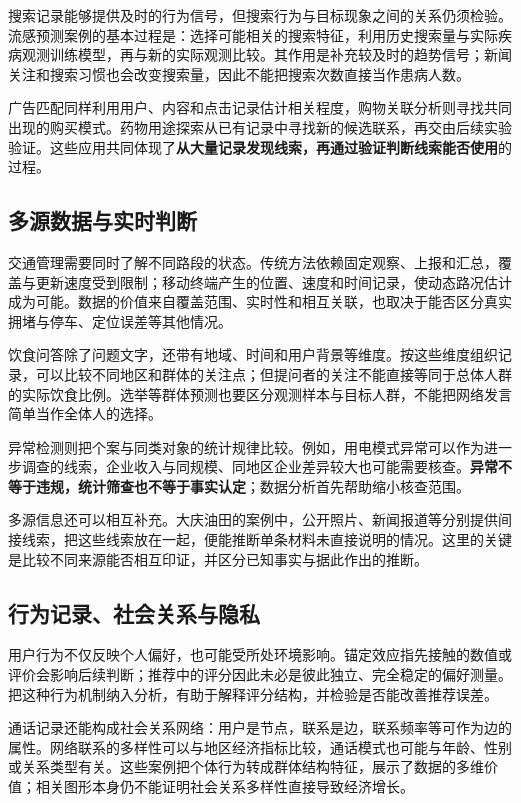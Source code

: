 \documentclass[UTF8,fontset=fandol,a4paper,12pt]{ctexart}
\theoremstyle{definition}
\begin{document}
搜索记录能够提供及时的行为信号，但搜索行为与目标现象之间的关系仍须检验。流感预测案例的基本过程是：选择可能相关的搜索特征，利用历史搜索量与实际疾病观测训练模型，再与新的实际观测比较。其作用是补充较及时的趋势信号；新闻关注和搜索习惯也会改变搜索量，因此不能把搜索次数直接当作患病人数。

广告匹配同样利用用户、内容和点击记录估计相关程度，购物关联分析则寻找共同出现的购买模式。药物用途探索从已有记录中寻找新的候选联系，再交由后续实验验证。这些应用共同体现了\textbf{从大量记录发现线索，再通过验证判断线索能否使用}的过程。

\subsection{多源数据与实时判断}
交通管理需要同时了解不同路段的状态。传统方法依赖固定观察、上报和汇总，覆盖与更新速度受到限制；移动终端产生的位置、速度和时间记录，使动态路况估计成为可能。数据的价值来自覆盖范围、实时性和相互关联，也取决于能否区分真实拥堵与停车、定位误差等其他情况。

饮食问答除了问题文字，还带有地域、时间和用户背景等维度。按这些维度组织记录，可以比较不同地区和群体的关注点；但提问者的关注不能直接等同于总体人群的实际饮食比例。选举等群体预测也要区分观测样本与目标人群，不能把网络发言简单当作全体人的选择。

异常检测则把个案与同类对象的统计规律比较。例如，用电模式异常可以作为进一步调查的线索，企业收入与同规模、同地区企业差异较大也可能需要核查。\textbf{异常不等于违规，统计筛查也不等于事实认定}；数据分析首先帮助缩小核查范围。

多源信息还可以相互补充。大庆油田的案例中，公开照片、新闻报道等分别提供间接线索，把这些线索放在一起，便能推断单条材料未直接说明的情况。这里的关键是比较不同来源能否相互印证，并区分已知事实与据此作出的推断。

\subsection{行为记录、社会关系与隐私}
用户行为不仅反映个人偏好，也可能受所处环境影响。锚定效应指先接触的数值或评价会影响后续判断；推荐中的评分因此未必是彼此独立、完全稳定的偏好测量。把这种行为机制纳入分析，有助于解释评分结构，并检验是否能改善推荐误差。

通话记录还能构成社会关系网络：用户是节点，联系是边，联系频率等可作为边的属性。网络联系的多样性可以与地区经济指标比较，通话模式也可能与年龄、性别或关系类型有关。这些案例把个体行为转成群体结构特征，展示了数据的多维价值；相关图形本身仍不能证明社会关系多样性直接导致经济增长。
\end{document}
